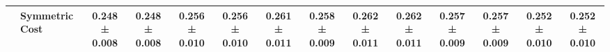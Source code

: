 \begin{table}[H]
{\begin{tabular}{llcccccccccccc}
 & Symmetric Cost & \textbf{0.248 ± 0.008} & \textbf{0.248 ± 0.008} & \textbf{0.256 ± 0.010} & \textbf{0.256 ± 0.010} & \textbf{0.261 ± 0.011} & \textbf{0.258 ± 0.009} & \textbf{0.262 ± 0.011} & \textbf{0.262 ± 0.011} & \textbf{0.257 ± 0.009} & \textbf{0.257 ± 0.009} & \textbf{0.252 ± 0.010} & \textbf{0.252 ± 0.010} \\
\cline{1-14}
\bottomrule
\end{tabular}
    }
\end{table}
